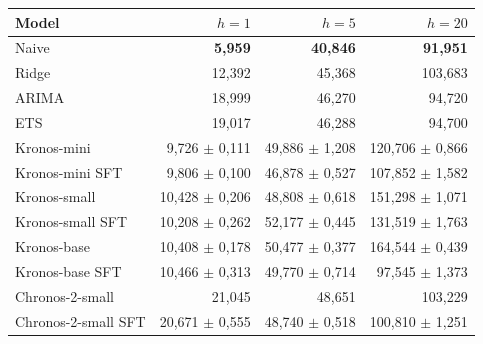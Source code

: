 \begin{tabular}{@{}lrrr@{}}
\toprule
Model & $h=1$ & $h=5$ & $h=20$ \\
\midrule
Naive & \textbf{5,959} & \textbf{40,846} & \textbf{91,951} \\
Ridge & 12,392 & 45,368 & 103,683 \\
ARIMA & 18,999 & 46,270 & 94,720 \\
ETS & 19,017 & 46,288 & 94,700 \\
\midrule
Kronos-mini & 9,726 $\pm$ 0,111 & 49,886 $\pm$ 1,208 & 120,706 $\pm$ 0,866 \\
Kronos-mini SFT & 9,806 $\pm$ 0,100 & 46,878 $\pm$ 0,527 & 107,852 $\pm$ 1,582 \\
Kronos-small & 10,428 $\pm$ 0,206 & 48,808 $\pm$ 0,618 & 151,298 $\pm$ 1,071 \\
Kronos-small SFT & 10,208 $\pm$ 0,262 & 52,177 $\pm$ 0,445 & 131,519 $\pm$ 1,763 \\
Kronos-base & 10,408 $\pm$ 0,178 & 50,477 $\pm$ 0,377 & 164,544 $\pm$ 0,439 \\
Kronos-base SFT & 10,466 $\pm$ 0,313 & 49,770 $\pm$ 0,714 & 97,545 $\pm$ 1,373 \\
Chronos-2-small & 21,045 & 48,651 & 103,229 \\
Chronos-2-small SFT & 20,671 $\pm$ 0,555 & 48,740 $\pm$ 0,518 & 100,810 $\pm$ 1,251 \\
\bottomrule
\end{tabular}
